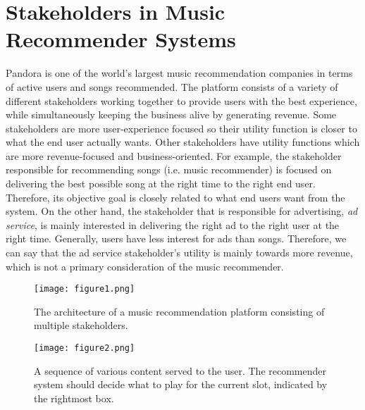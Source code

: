 \section{Stakeholders in Music Recommender Systems}
Pandora is one of the world's largest music recommendation companies in terms of active users and songs recommended. The platform consists of a variety of different stakeholders working together to provide users with the best experience, while simultaneously keeping the business alive by generating revenue. Some stakeholders are more user-experience focused so their utility function is closer to what the end user actually wants. Other stakeholders have utility functions which are more revenue-focused and business-oriented. For example, the stakeholder responsible for recommending songs (i.e. music recommender) is focused on delivering the best possible song at the right time to the right end user. Therefore, its objective goal is closely related to what end users want from the system. On the other hand, the stakeholder that is responsible for advertising, \textit{ad service}, is mainly interested in delivering the right ad to the right user at the right time. Generally, users have less interest for ads than songs. Therefore, we can say that the ad service stakeholder's utility is mainly towards more revenue, which is not a primary consideration of the music recommender. 

\begin{figure*}[t]
    \centering
    \texttt{[image: figure1.png]}
    \caption{The architecture of a music recommendation platform consisting of multiple stakeholders.}
    \label{fig:ms}
\end{figure*}

\begin{figure*}[t]
    \centering
   \texttt{[image: figure2.png]}
    \caption{A sequence of various content served to the user. The recommender system should decide what to play for the current slot, indicated by the rightmost box.}
    \label{fig:sequence}
\end{figure*}

